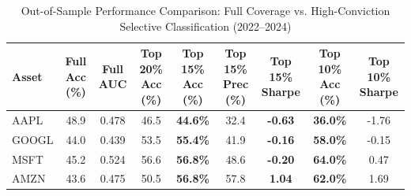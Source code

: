 \begin{table}[t]
\centering
\caption{Out-of-Sample Performance Comparison: Full Coverage vs. High-Conviction Selective Classification (2022--2024)}
\label{tab:selective_classification_results}
\begin{tabular}{lcccccccc}
\hline
\textbf{Asset} & \textbf{Full Acc (\%)} & \textbf{Full AUC} & \textbf{Top 20\% Acc (\%)} & \textbf{Top 15\% Acc (\%)} & \textbf{Top 15\% Prec (\%)} & \textbf{Top 15\% Sharpe} & \textbf{Top 10\% Acc (\%)} & \textbf{Top 10\% Sharpe} \\
\hline
AAPL & 48.9 & 0.478 & 46.5 & \textbf{44.6\%} & 32.4 & \textbf{-0.63} & \textbf{36.0\%} & -1.76 \\
GOOGL & 44.0 & 0.439 & 53.5 & \textbf{55.4\%} & 41.9 & \textbf{-0.16} & \textbf{58.0\%} & -0.15 \\
MSFT & 45.2 & 0.524 & 56.6 & \textbf{56.8\%} & 48.6 & \textbf{-0.20} & \textbf{64.0\%} & 0.47 \\
AMZN & 43.6 & 0.475 & 50.5 & \textbf{56.8\%} & 57.8 & \textbf{1.04} & \textbf{62.0\%} & 1.69 \\
\hline
\end{tabular}
\end{table}
